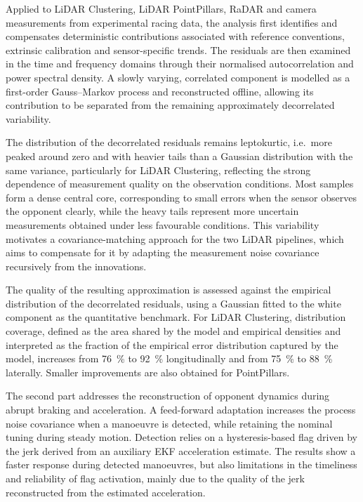 Applied to LiDAR Clustering, LiDAR PointPillars, RaDAR and camera measurements from experimental racing data, the analysis first identifies and compensates deterministic contributions associated with reference conventions, extrinsic calibration and sensor-specific trends. The residuals are then examined in the time and frequency domains through their normalised autocorrelation and power spectral density. A slowly varying, correlated component is modelled as a first-order Gauss--Markov process and reconstructed offline, allowing its contribution to be separated from the remaining approximately decorrelated variability.

The distribution of the decorrelated residuals remains leptokurtic, i.e.\ more peaked around zero and with heavier tails than a Gaussian distribution with the same variance, particularly for LiDAR Clustering, reflecting the strong dependence of measurement quality on the observation conditions. Most samples form a dense central core, corresponding to small errors when the sensor observes the opponent clearly, while the heavy tails represent more uncertain measurements obtained under less favourable conditions. This variability motivates a covariance-matching approach for the two LiDAR pipelines, which aims to compensate for it by adapting the measurement noise covariance recursively from the innovations.

The quality of the resulting approximation is assessed against the empirical distribution of the decorrelated residuals, using a Gaussian fitted to the white component as the quantitative benchmark. For LiDAR Clustering, distribution coverage, defined as the area shared by the model and empirical densities and interpreted as the fraction of the empirical error distribution captured by the model, increases from \SI{76}{\percent} to \SI{92}{\percent} longitudinally and from \SI{75}{\percent} to \SI{88}{\percent} laterally. Smaller improvements are also obtained for PointPillars.

The second part addresses the reconstruction of opponent dynamics during abrupt braking and acceleration. A feed-forward adaptation increases the process noise covariance when a manoeuvre is detected, while retaining the nominal tuning during steady motion. Detection relies on a hysteresis-based flag driven by the jerk derived from an auxiliary EKF acceleration estimate. The results show a faster response during detected manoeuvres, but also limitations in the timeliness and reliability of flag activation, mainly due to the quality of the jerk reconstructed from the estimated acceleration.

